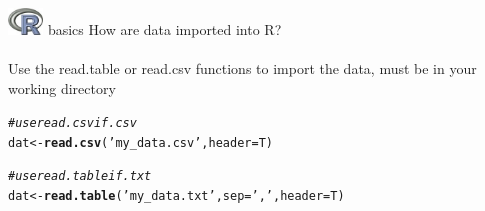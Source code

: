 \documentclass[xcolor=svgnames]{beamer}\usepackage[]{graphicx}\usepackage[]{color}
\makeatletter
\newcommand{\hlstr}[1]{\textcolor[rgb]{0.192,0.494,0.8}{#1}}%
\newcommand{\hlcom}[1]{\textcolor[rgb]{0.678,0.584,0.686}{\textit{#1}}}%
\newcommand{\hlstd}[1]{\textcolor[rgb]{0.345,0.345,0.345}{#1}}%
\newcommand{\hlkwb}[1]{\textcolor[rgb]{0.69,0.353,0.396}{#1}}%
\newcommand{\hlkwc}[1]{\textcolor[rgb]{0.333,0.667,0.333}{#1}}%
\newcommand{\hlkwd}[1]{\textcolor[rgb]{0.737,0.353,0.396}{\textbf{#1}}}%
\newenvironment{kframe}{%
 \def\at@end@of@kframe{}%
 \ifinner\ifhmode%
  \def\at@end@of@kframe{\end{minipage}}%
  \begin{minipage}{\columnwidth}%
 \fi\fi%
 \def\FrameCommand##1{\hskip\@totalleftmargin \hskip-\fboxsep
 \colorbox{shadecolor}{##1}\hskip-\fboxsep
     \hskip-\linewidth \hskip-\@totalleftmargin \hskip\columnwidth}%
 \MakeFramed {\advance\hsize-\width
   \@totalleftmargin\z@ \linewidth\hsize
   \@setminipage}}%
 {\par\unskip\endMakeFramed%
 \at@end@of@kframe}
\newenvironment{knitrout}{}{} %
\makeatother
\begin{document}
\begin{frame}[t,fragile]{\includegraphics[width=0.07\textwidth]{Rlogo.jpg} \hspace{0.01in} basics}
How are data imported into R?\\~\\
Use the read.table or read.csv functions to import the data, must be in your working directory
\begin{knitrout}\scriptsize
{}\color{fgcolor}\begin{kframe}
\begin{alltt}
\hlcom{# use read.csv if .csv}
\hlstd{dat} \hlkwb{<-} \hlkwd{read.csv}\hlstd{(}\hlstr{'my_data.csv'}\hlstd{,} \hlkwc{header} \hlstd{= T)}

\hlcom{# use read.table if .txt}
\hlstd{dat} \hlkwb{<-} \hlkwd{read.table}\hlstd{(}\hlstr{'my_data.txt'}\hlstd{,} \hlkwc{sep} \hlstd{=} \hlstr{','}\hlstd{,} \hlkwc{header} \hlstd{= T)}
\end{alltt}
\end{kframe}
\end{knitrout}
\end{frame}
\end{document}

